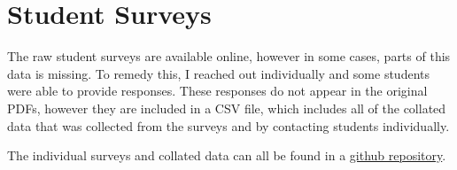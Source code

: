 \providecommand{\heading}[1]{\section{#1}}
\providecommand{\subheading}[1]{\subsection{#1}}

\providecommand{\survey}[1]{
    \subsection{Student #1}\label{subsec:surveys-s#1}
        \subsubsection*{Survey 1: Crypto Cracking}
            
        \subsubsection*{Survey 2: Going Backwards}
            
}

\section{Student Surveys}
    The raw student surveys are available online, however in some cases, parts of this data is missing. 
    To remedy this, I reached out individually and some students were able to provide responses. 
    These responses do not appear in the original PDFs, however they are included in a CSV file, which includes all of the collated data that was collected from the surveys and by contacting students individually. 

    The individual surveys and collated data can all be found in a \href{https://github.com/brendonky18/Honors-Thesis.Data}{github repository}.
